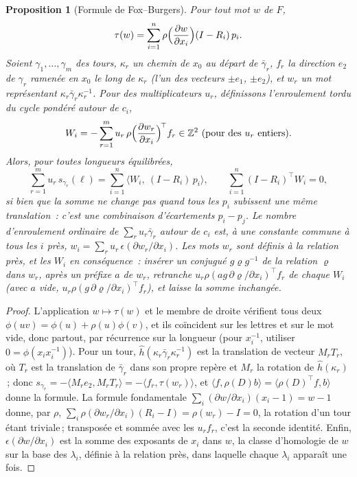 \documentclass[11pt,a4paper]{article}
\newtheorem{proposition}{Proposition}
\newcommand{\Z}{\mathbb{Z}}
\newcommand{\shift}{s}
\newcommand{\lean}[1]{\texttt{\detokenize{#1}}}
\newenvironment{evidence}[3][]{}{}
\begin{document}
\begin{evidence}{core}{\lean{fox_burgers}, \lean{fox_fundamental}, \lean{fox_burgers_combination}\,; supposé~: la présentation du groupe fondamental par les lacets autour des sommets singuliers}
\begin{proposition}[Formule de Fox--Burgers]\label{prop:fox}
Pour tout mot $w$ de $F$,
\[
  \tau(w) = \sum_{i=1}^n \rho\Bigl(\frac{\partial w}{\partial x_i}\Bigr)
  (I - R_i)\,p_i .
\]
Soient $\gamma_1, \dots, \gamma_m$ des tours, $\kappa_r$ un chemin de $x_0$
au départ de $\bar\gamma_r$, $f_r$ la direction $e_2$ de $\gamma_r$ ramenée en
$x_0$ le long de $\kappa_r$ (l'un des vecteurs $\pm e_1$, $\pm e_2$), et $w_r$
un mot représentant $\kappa_r \bar\gamma_r \kappa_r^{-1}$. Pour des
multiplicateurs $u_r$, définissons l'\emph{enroulement tordu} du cycle pondéré
autour de $c_i$,
\[
  W_i = -\sum_{r=1}^m u_r\, \rho\Bigl(\frac{\partial w_r}{\partial x_i}\Bigr)^{\!\top} f_r
  \in \Z^2 \text{ (pour des } u_r \text{ entiers)} .
\]
Alors, pour toutes longueurs équilibrées,
\[
  \sum_{r=1}^m u_r\, \shift_{\gamma_r}(\ell) = \sum_{i=1}^n \bigl\langle W_i,\
  (I - R_i)\,p_i \bigr\rangle ,
  \qquad
  \sum_{i=1}^n (I - R_i)^\top W_i = 0 ,
\]
si bien que la somme ne change pas quand tous les $p_i$ subissent une même
translation~: c'est une combinaison d'écartements $p_i - p_j$. Le nombre
d'enroulement ordinaire de $\sum_r u_r \bar\gamma_r$ autour de $c_i$ est, à
une constante commune à tous les $i$ près, $w_i = \sum_r u_r\,
\epsilon(\partial w_r/\partial x_i)$. Les mots $w_r$ sont définis à la
relation près, et les $W_i$ en conséquence~: insérer un conjugué $g\varrho
g^{-1}$ de la relation $\varrho$ dans $w_r$, après un préfixe $a$ de $w_r$,
retranche $u_r \rho(a g\, \partial \varrho/\partial x_i)^\top f_r$ de chaque $W_i$
(avec $a$ vide, $u_r \rho(g\, \partial \varrho/\partial x_i)^\top f_r$), et
laisse la somme inchangée.
\end{proposition}
\end{evidence}

\begin{proof}
L'application $w \mapsto \tau(w)$ et le membre de droite vérifient tous deux
$\phi(uv) = \phi(u) + \rho(u)\phi(v)$, et ils coïncident sur les lettres et
sur le mot vide, donc partout, par récurrence sur la longueur (pour
$x_i^{-1}$, utiliser $0 = \phi(x_i x_i^{-1})$). Pour un tour, $\hat
h(\kappa_r \bar\gamma_r \kappa_r^{-1})$ est la translation de vecteur $M_r
T_r$, où $T_r$ est la translation de $\bar\gamma_r$ dans son propre repère et
$M_r$ la rotation de $\hat h(\kappa_r)$\,; donc $\shift_{\gamma_r} = -\langle
M_r e_2, M_r T_r \rangle = -\langle f_r, \tau(w_r) \rangle$, et $\langle f,
\rho(D) b\rangle = \langle \rho(D)^\top f, b \rangle$ donne la formule. La
formule fondamentale $\sum_i (\partial w/\partial x_i)(x_i - 1) = w - 1$
donne, par $\rho$, $\sum_i \rho(\partial w_r/\partial x_i)(R_i - I) =
\rho(w_r) - I = 0$, la rotation d'un tour étant triviale\,; transposée et
sommée avec les $u_r f_r$, c'est la seconde identité. Enfin, $\epsilon(\partial
w/\partial x_i)$ est la somme des exposants de $x_i$ dans $w$, la classe
d'homologie de $w$ sur la base des $\lambda_i$, définie à la relation près,
dans laquelle chaque $\lambda_i$ apparaît une fois.
\end{proof}
\end{document}
